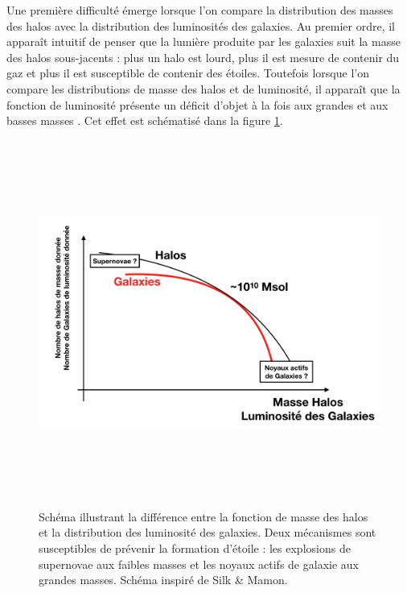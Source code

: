 Une première difficulté émerge lorsque l'on compare la distribution des masses des halos avec la distribution des luminosités des galaxies. Au premier ordre, il apparaît intuitif de penser que la lumière produite par les galaxies suit la masse des halos sous-jacents : plus un halo est lourd, plus il est mesure de contenir du gaz et plus il est susceptible de contenir des étoiles. Toutefois lorsque l'on compare les distributions de masse des halos et de luminosité, il apparaît que la fonction de luminosité présente un déficit d'objet à la fois aux grandes et aux basses masses . Cet effet est schématisé dans la figure \ref{f:silkmamon}.
\begin{figure}[htbp]
	\centering
		\includegraphics[height=12cm]{figs/SilkMamon.png}
	\caption[Schéma illustrant la différence entre la fonction de masse des halos et la distribution des luminosité des galaxies]{Schéma illustrant la différence entre la fonction de masse des halos et la distribution des luminosité des galaxies. Deux mécanismes sont susceptibles de prévenir la formation d'étoile : les explosions de supernovae aux faibles masses et les noyaux actifs de galaxie aux grandes masses.  Schéma inspiré de Silk \& Mamon. } 
	\label{f:silkmamon}
\end{figure}
